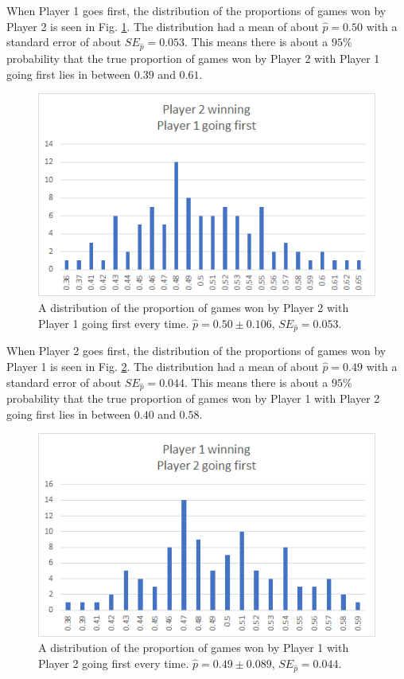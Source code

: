 \documentclass{article}
\begin{document}
When Player 1 goes first, the distribution of the proportions of games won by Player 2 is seen in Fig. \ref{2wins1goesfirst}. The distribution had a mean of about $\hat{p} = 0.50$ with a standard error of about $SE_{\hat{p}} = 0.053$. This means there is about a $95\%$ probability that the true proportion of games won by Player 2 with Player 1 going first lies in between $0.39$ and $0.61$.
\begin{figure}
	\centering
	\includegraphics[width=0.7\linewidth]{2wins1goesfirst}
	\caption{A distribution of the proportion of games won by Player 2 with Player 1 going first every time. $\hat{p} = 0.50 \pm 0.106$, $SE_{\hat{p}} = 0.053$.}
	\label{2wins1goesfirst}
\end{figure}

When Player 2 goes first, the distribution of the proportions of games won by Player 1 is seen in Fig. \ref{1wins2goesfirst}. The distribution had a mean of about $\hat{p} = 0.49$ with a standard error of about $SE_{\hat{p}} = 0.044$. This means there is about a $95\%$ probability that the true proportion of games won by Player 1 with Player 2 going first lies in between $0.40$ and $0.58$.
\begin{figure}
	\centering
	\includegraphics[width=0.7\linewidth]{1wins2goesfirst}
	\caption{A distribution of the proportion of games won by Player 1 with Player 2 going first every time. $\hat{p} = 0.49 \pm 0.089$, $SE_{\hat{p}} = 0.044$.}
	\label{1wins2goesfirst}
\end{figure}
\end{document}
